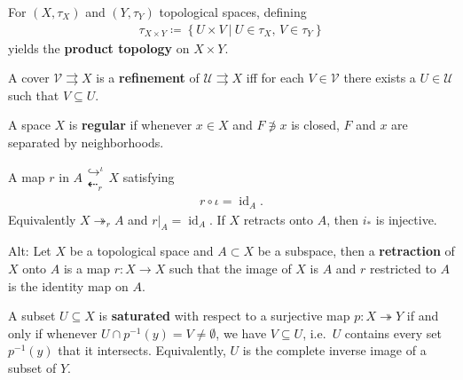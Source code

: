 \begin{definition}

For \((X, \tau_X)\) and \((Y, \tau_Y)\) topological spaces, defining
\begin{align*}
\tau_{X \times Y} \coloneqq\left\{{U \times V {~\mathrel{\Big|}~}U\in \tau_X,\, V\in \tau_Y}\right\}
\end{align*}
yields the \textbf{product topology} on \(X \times Y\).

\end{definition}

\begin{definition}[Refinement]

A cover \({\mathcal{V}}\rightrightarrows X\) is a \textbf{refinement} of
\({\mathcal{U}}\rightrightarrows X\) iff for each \(V\in {\mathcal{V}}\)
there exists a \(U\in{\mathcal{U}}\) such that \(V\subseteq U\).

\end{definition}

\begin{definition}[Regular]

A space \(X\) is \textbf{regular} if whenever \(x\in X\) and
\(F\not\ni x\) is closed, \(F\) and \(x\) are separated by
neighborhoods.

\end{definition}

\begin{definition}[Retract]

A map \(r\) in
\(A\mathrel{\textstyle\substack{\hookrightarrow^{\iota}\\\textstyle\dashleftarrow_{r}}} X\)
satisfying
\begin{align*}r\circ\iota = \operatorname{id}_{A}.\end{align*}
Equivalently \(X \twoheadrightarrow_{r} A\) and
\({\left.{{r}} \right|_{{A}} } = \operatorname{id}_{A}\). If \(X\)
retracts onto \(A\), then \(i_*\) is injective.

Alt: Let \(X\) be a topological space and \(A \subset X\) be a subspace,
then a \textbf{retraction} of \(X\) onto \(A\) is a map \(r: X\to X\)
such that the image of \(X\) is \(A\) and \(r\) restricted to \(A\) is
the identity map on \(A\).

\end{definition}

\begin{definition}[Saturated]

A subset \(U \subseteq X\) is \textbf{saturated} with respect to a
surjective map \(p: X\twoheadrightarrow Y\) if and only if whenever
\(U \cap p ^{-1} (y) = V \neq \emptyset\), we have \(V \subseteq U\),
i.e.~\(U\) contains every set \(p ^{-1} (y)\) that it intersects.
Equivalently, \(U\) is the complete inverse image of a subset of \(Y\).

\end{definition}

